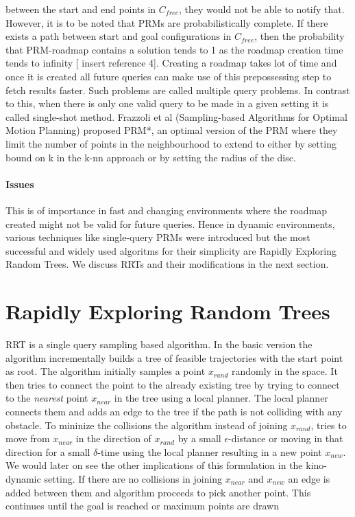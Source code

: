 \documentclass[MTech]{iitmdiss}
\begin{document}
between the start and end points in $C_{free}$, they would not be able to notify that. However, it is to be noted that PRMs are probabilistically complete. If there exists a path between start and goal configurations in $C_{free}$, then the probability that PRM-roadmap contains a solution tends to 1 as the roadmap creation time tends to infinity [ insert reference 4]. Creating a roadmap takes lot of time and once it is created all future queries can make use of this prepossessing step to fetch results faster. Such problems are called multiple query problems. In contrast to this, when there is only one valid query to be made in a given setting it is called single-shot method. Frazzoli et al (Sampling-based Algorithms for Optimal Motion Planning) proposed PRM*, an optimal version of the PRM where they limit the number of points in the neighbourhood to extend to either by setting bound on k in the k-nn approach or by setting the radius of the disc. 
\subsubsection*{Issues}
 This is of importance in fast and changing environments where the roadmap created might not be valid for future queries. Hence in dynamic environments, various techniques like single-query PRMs were introduced but the most successful and widely used algoritms for their simplicity are Rapidly Exploring Random Trees. We discuss RRTs and their modifications in the next section.  

\chapter{Rapidly Exploring Random Trees}

RRT is a single query sampling based algorithm. In the basic version the algorithm incrementally builds a tree of feasible trajectories with the start point as root. The algorithm initially samples a point $x_{rand}$ randomly in the space. It then tries to connect the point to the already existing tree by trying to connect to the \emph{nearest} point $x_{near}$ in the tree using a local planner. The local planner connects them and adds an edge to the tree if the path is not colliding with any obstacle. To mininize the collisions the algorithm instead of joining $x_{rand}$, tries to move from $x_{near}$ in the direction of $x_{rand}$ by a small $\epsilon$-distance or moving in that direction for a small $\delta$-time using the local planner resulting in a new point $x_{new}$. We would later on see the other implications of this formulation in the kino-dynamic setting. If there are no collisions in joining $x_{near}$ and $x_{new}$ an edge is added between them and algorithm proceeds to pick another point. This continues until the goal is reached or maximum points are drawn 
\end{document}
